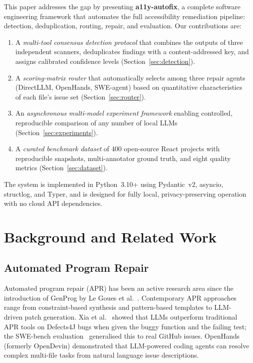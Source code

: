 \documentclass[10pt,conference]{IEEEtran}
\begin{document}
This paper addresses the gap by presenting \textbf{a11y-autofix}, a complete
software engineering framework that automates the full accessibility
remediation pipeline: detection, deduplication, routing, repair, and
evaluation.  Our contributions are:

\begin{enumerate}
  \item A \emph{multi-tool consensus detection protocol} that combines the
    outputs of three independent scanners, deduplicates findings with a
    content-addressed key, and assigns calibrated confidence levels
    (Section~\ref{sec:detection}).
  \item A \emph{scoring-matrix router} that automatically selects among
    three repair agents (DirectLLM, OpenHands, SWE-agent) based on
    quantitative characteristics of each file's issue set
    (Section~\ref{sec:router}).
  \item An \emph{asynchronous multi-model experiment framework} enabling
    controlled, reproducible comparison of any number of local LLMs
    (Section~\ref{sec:experiments}).
  \item A \emph{curated benchmark dataset} of 400 open-source React projects
    with reproducible snapshots, multi-annotator ground truth, and eight
    quality metrics (Section~\ref{sec:dataset}).
\end{enumerate}

The system is implemented in Python~3.10+ using Pydantic~v2, asyncio,
structlog, and Typer, and is designed for fully local, privacy-preserving
operation with no cloud API dependencies.

\section{Background and Related Work}
\label{sec:related}

\subsection{Automated Program Repair}

Automated program repair (APR) has been an active research area since the
introduction of GenProg by Le Goues et al.\ \cite{legoues2012}. Contemporary
APR approaches range from constraint-based synthesis and pattern-based
templates to LLM-driven patch generation.  Xia et al.\ \cite{xia2023} showed
that LLMs outperform traditional APR tools on Defects4J bugs when given the
buggy function and the failing test; the SWE-bench evaluation~\cite{swebench}
generalised this to real GitHub issues.  OpenHands (formerly OpenDevin)
\cite{openhands2024} demonstrated that LLM-powered coding agents can resolve
complex multi-file tasks from natural language issue descriptions.
\end{document}
